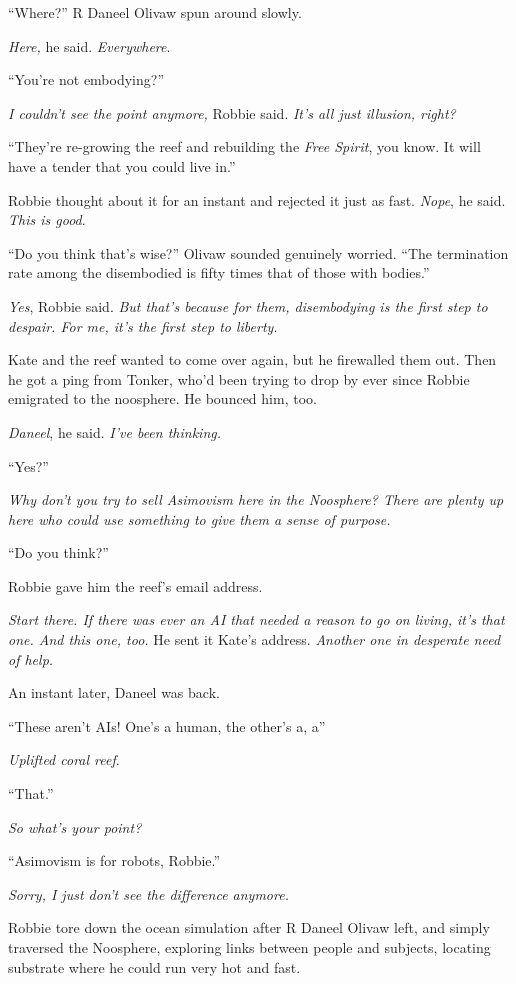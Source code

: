 “Where?” R Daneel Olivaw spun around slowly.

\emph{Here,} he said. \emph{Everywhere}.

“You’re not embodying?”

\emph{I couldn’t see the point anymore,} Robbie said.
\emph{It’s all just illusion, right?}

“They’re re-growing the reef and rebuilding the \emph{Free Spirit},
you know. It will have a tender that you could live in.”

Robbie thought about it for an instant and rejected it just as
fast. \emph{Nope}, he said. \emph{This is good}.

“Do you think that’s wise?” Olivaw sounded genuinely worried. “The
termination rate among the disembodied is fifty times that of those
with bodies.”

\emph{Yes}, Robbie said.
\emph{But that’s because for them, disembodying is the first step to despair. For me, it’s the first step to liberty.}

Kate and the reef wanted to come over again, but he firewalled them
out. Then he got a ping from Tonker, who’d been trying to drop by
ever since Robbie emigrated to the noosphere. He bounced him, too.

\emph{Daneel}, he said. \emph{I’ve been thinking.}

“Yes?”

\emph{Why don’t you try to sell Asimovism here in the Noosphere? There are plenty up here who could use something to give them a sense of purpose.}

“Do you think?”

Robbie gave him the reef’s email address.

\emph{Start there. If there was ever an AI that needed a reason to go on living, it’s that one. And this one, too.}
He sent it Kate’s address.
\emph{Another one in desperate need of help.}

An instant later, Daneel was back.

“These aren’t AIs! One’s a human, the other’s a, a\dash{}”

\emph{Uplifted coral reef}.

“That.”

\emph{So what’s your point?}

“Asimovism is for robots, Robbie.”

\emph{Sorry, I just don’t see the difference anymore.}

\tb

Robbie tore down the ocean simulation after R Daneel Olivaw left,
and simply traversed the Noosphere, exploring links between people
and subjects, locating substrate where he could run very hot and
fast.

